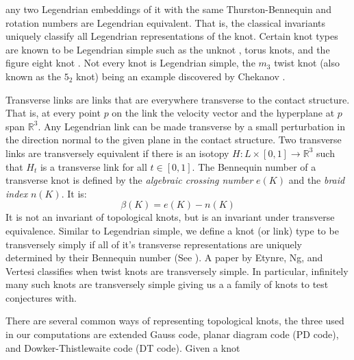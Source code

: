 \documentclass{article}
\theoremstyle{plain}
\begin{document}
        any two Legendrian embeddings of it with the same Thurston-Bennequin
        and rotation numbers are Legendrian equivalent. That is, the classical
        invariants uniquely classify all Legendrian representations of the knot.
        Certain knot types are known to be Legendrian simple such as the unknot
        \cite{EliashbergFraserClassificationTopTrivialLegKnots}, torus knots,
        and the figure eight knot \cite{EtnyreHondaContactTopologyI}.
        Not every knot is Legendrian simple, the $m_{3}$ twist knot (also
        known as the $5_{2}$ knot) being an example discovered by Chekanov
        \cite{ChekanovDifAlgOfLegLinks}.
        \par\hfill\par
        Transverse links are links that are everywhere transverse to the
        contact structure. That is, at every point $p$ on the link the velocity
        vector and the hyperplane at $p$ span $\mathbb{R}^{3}$. Any Legendrian
        link can be made transverse by a small perturbation in the direction
        normal to the given plane in the contact structure.
        Two transverse links are transversely equivalent if there is an
        isotopy $H:L\times[0,1]\rightarrow\mathbb{R}^{3}$ such that $H_{t}$ is a
        transverse link for all $t\in[0,1]$. The Bennequin number of a
        transverse knot is defined by the \textit{algebraic crossing number}
        $e(K)$ and the \textit{braid index} $n(K)$. It is:
        \begin{equation}
            \beta(K)=e(K)-n(K)
        \end{equation}
        It is not an invariant of topological knots, but is an invariant under
        transverse equivalence. Similar to Legendrian simple, we define a knot
        (or link) type to be transversely simply if all of it's transverse
        representations are uniquely determined by their Bennequin number
        (See \cite{BirmanWrinkleTransversallySimpleKnots}). A paper by
        Etynre, Ng, and Vertesi
        \cite{EtnyreEtAlLegendrianAndTransverseTwistKnots}
        classifies when twist knots are transversely simple. In
        particular, infinitely many such knots are transversely simple giving
        us a a family of knots to test conjectures with.
        \par\hfill\par
        There are several common ways of representing topological knots, the
        three used in our computations are extended Gauss code, planar diagram
        code (PD code), and Dowker-Thistlewaite code (DT code). Given a knot
\end{document}
